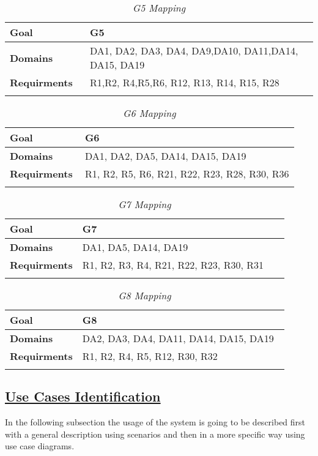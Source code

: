 			\begin{longtable}{p{0.26\linewidth}p{0.75\linewidth}}
				\toprule
				\textbf{Goal} & G5\\
				\midrule
				\textbf{Domains} & DA1, DA2, DA3, DA4, DA9,DA10, DA11,DA14, DA15, DA19\\
				\midrule
				\textbf{Requirments} & R1,R2, R4,R5,R6, R12, R13, R14, R15, R28 \\
				\bottomrule
				\caption{\emph{G5 Mapping}}
			\end{longtable}	
		
			\begin{longtable}{p{0.26\linewidth}p{0.75\linewidth}}
				\toprule
				\textbf{Goal} & G6\\
				\midrule
				\textbf{Domains} & DA1, DA2, DA5, DA14, DA15, DA19\\
				\midrule
				\textbf{Requirments} & R1, R2, R5, R6, R21, R22, R23, R28, R30, R36 \\
				\bottomrule
				\caption{\emph{G6 Mapping}}
			\end{longtable}
		
			\begin{longtable}{p{0.26\linewidth}p{0.75\linewidth}}
				\toprule
				\textbf{Goal} & G7\\
				\midrule
				\textbf{Domains} & DA1, DA5, DA14, DA19\\
				\midrule
				\textbf{Requirments} & R1, R2, R3, R4, R21, R22, R23, R30, R31 \\
				\bottomrule
				\caption{\emph{G7 Mapping}}
			\end{longtable}
		
			\begin{longtable}{p{0.26\linewidth}p{0.75\linewidth}}
				\toprule
				\textbf{Goal} & G8\\
				\midrule
				\textbf{Domains} & DA2, DA3, DA4, DA11, DA14, DA15, DA19\\
				\midrule
				\textbf{Requirments} & R1, R2, R4, R5, R12, R30, R32 \\
				\bottomrule
				\caption{\emph{G8 Mapping}}
			\end{longtable}						
		\newpage

\subsection[Use Cases Identification]{\hyperlink{toc}{Use Cases Identification}}
	In the following subsection the usage of the system is going to be described first with a general description using scenarios and then in a more specific way using use case diagrams.
	
